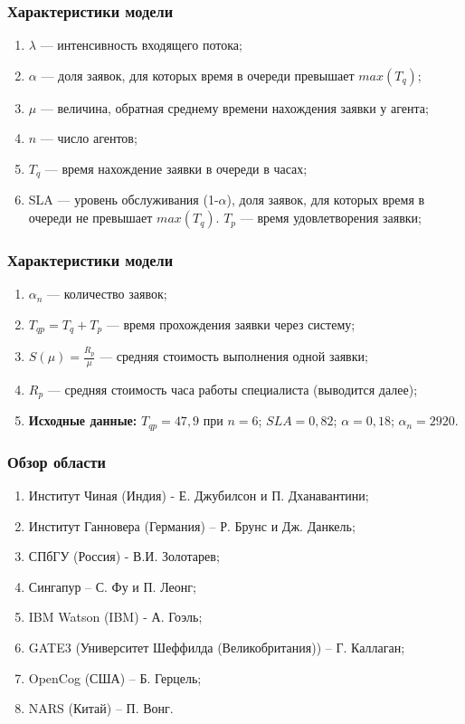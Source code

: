 \documentclass[14pt]{beamer}
\begin{document}
\begin{frame}
\frametitle{Характеристики модели}
\begin{enumerate}
 \item $\lambda$ --- интенсивность входящего потока;
    \item $\alpha$ --- доля заявок, для которых время в очереди превышает $max(T_q)$;       
    \item $\mu$ --- величина, обратная среднему времени нахождения заявки у агента;
	\item  $n$ --- число агентов;
	\item $T_q$ --- время нахождение заявки в очереди в часах;
	\item SLA --- уровень обслуживания (1-$\alpha$), доля заявок, для которых время в очереди не превышает $max(T_q)$. $T_p$ --- время удовлетворения заявки;
 	

\end{enumerate}
\end{frame}

\begin{frame}
\frametitle{Характеристики модели}
\begin{enumerate}
 \item $\alpha_n$ --- количество заявок;
 \item	$T_{qp}=T_q+T_p$ --- время прохождения заявки через систему;
 \item	$S(\mu)= \frac{R_p}{\mu} $ --- средняя стоимость выполнения одной заявки;
 \item $R_p$ --- средняя стоимость часа работы специалиста (выводится далее);
 \item \textbf{Исходные данные:} $T_{qp}=47,9$ при $n=6$; $SLA=0,82$; $\alpha=0,18$;  $\alpha_n=2920$. 
\end{enumerate}
\end{frame}

\begin{frame}
\frametitle{Обзор области}
\begin{enumerate}
 \item Институт Чиная (Индия) - Е. Джубилсон и П. Дханавантини;
 \item Институт Ганновера (Германия) – Р. Брунс и Дж. Данкель;
 \item СПбГУ (Россия) - В.И. Золотарев;
 \item Сингапур – С. Фу и П. Леонг;
 \item IBM Watson (IBM) - А. Гоэль;
 \item GATE3 (Университет Шеффилда (Великобритания)) – Г. Каллаган;
 \item OpenCog (США) –  Б. Герцель;
 \item NARS (Китай) – П. Вонг.
\end{enumerate}
\end{frame}
\end{document}
